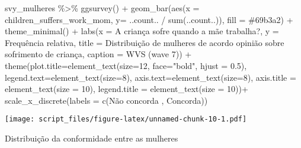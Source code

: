 \documentclass[
]{article}
\newenvironment{Shaded}{\begin{snugshade}}{\end{snugshade}}
\newcommand{\AttributeTok}[1]{\textcolor[rgb]{0.77,0.63,0.00}{#1}}
\newcommand{\DecValTok}[1]{\textcolor[rgb]{0.00,0.00,0.81}{#1}}
\newcommand{\FloatTok}[1]{\textcolor[rgb]{0.00,0.00,0.81}{#1}}
\newcommand{\FunctionTok}[1]{\textcolor[rgb]{0.00,0.00,0.00}{#1}}
\newcommand{\NormalTok}[1]{#1}
\newcommand{\SpecialCharTok}[1]{\textcolor[rgb]{0.00,0.00,0.00}{#1}}
\newcommand{\StringTok}[1]{\textcolor[rgb]{0.31,0.60,0.02}{#1}}
\begin{document}
\begin{Shaded}
\begin{Highlighting}[]
\NormalTok{svy\_mulheres }\SpecialCharTok{\%\textgreater{}\%}
  \FunctionTok{ggsurvey}\NormalTok{() }\SpecialCharTok{+}
  \FunctionTok{geom\_bar}\NormalTok{(}\FunctionTok{aes}\NormalTok{(}\AttributeTok{x =}\NormalTok{ children\_suffers\_work\_mom, }\AttributeTok{y=}\NormalTok{ ..count.. }\SpecialCharTok{/} \FunctionTok{sum}\NormalTok{(..count..)), }\AttributeTok{fill =} \StringTok{\textquotesingle{}\#69b3a2\textquotesingle{}}\NormalTok{) }\SpecialCharTok{+}
  \FunctionTok{theme\_minimal}\NormalTok{() }\SpecialCharTok{+}
  \FunctionTok{labs}\NormalTok{(}\AttributeTok{x =} \StringTok{\textquotesingle{}A criança sofre quando a mãe trabalha?\textquotesingle{}}\NormalTok{,}
       \AttributeTok{y =} \StringTok{\textquotesingle{}Frequência relativa\textquotesingle{}}\NormalTok{,}
       \AttributeTok{title =} \StringTok{\textquotesingle{}Distribuição de mulheres de acordo opinião sobre sofrimento de criança\textquotesingle{}}\NormalTok{,}
       \AttributeTok{caption =} \StringTok{\textquotesingle{}WVS (wave 7)\textquotesingle{}}\NormalTok{) }\SpecialCharTok{+}
  \FunctionTok{theme}\NormalTok{(}\AttributeTok{plot.title=}\FunctionTok{element\_text}\NormalTok{(}\AttributeTok{size=}\DecValTok{12}\NormalTok{, }\AttributeTok{face=}\StringTok{"bold"}\NormalTok{, }\AttributeTok{hjust =} \FloatTok{0.5}\NormalTok{),}
        \AttributeTok{legend.text=}\FunctionTok{element\_text}\NormalTok{(}\AttributeTok{size=}\DecValTok{8}\NormalTok{),}
        \AttributeTok{axis.text=}\FunctionTok{element\_text}\NormalTok{(}\AttributeTok{size=}\DecValTok{8}\NormalTok{),}
        \AttributeTok{axis.title =} \FunctionTok{element\_text}\NormalTok{(}\AttributeTok{size =} \DecValTok{10}\NormalTok{),}
        \AttributeTok{legend.title =} \FunctionTok{element\_text}\NormalTok{(}\AttributeTok{size =} \DecValTok{10}\NormalTok{))}\SpecialCharTok{+}
  \FunctionTok{scale\_x\_discrete}\NormalTok{(}\AttributeTok{labels =} \FunctionTok{c}\NormalTok{(}\StringTok{\textquotesingle{}Não concorda \textquotesingle{}}\NormalTok{, }\StringTok{\textquotesingle{}Concorda\textquotesingle{}}\NormalTok{))}
\end{Highlighting}
\end{Shaded}

\texttt{[image: script\_files/figure-latex/unnamed-chunk-10-1.pdf]}

Distribuição da conformidade entre as mulheres
\end{document}
